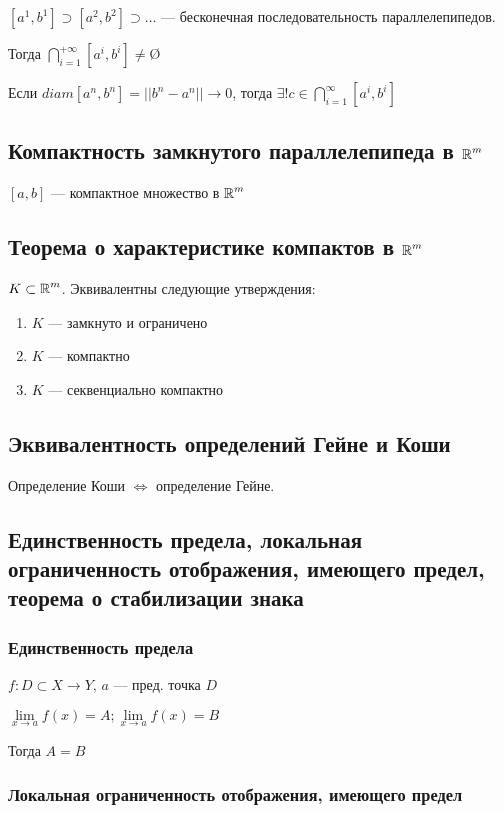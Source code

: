 $[a^1, b^1]\supset[a^2, b^2]\supset\ldots$ --- бесконечная последовательность параллелепипедов.

Тогда $\bigcap\limits_{i=1}^{+\infty}[a^i, b^i]\not=$\O

Если $diam[a^n, b^n]=||b^n-a^n||\to 0$, тогда $\exists! c\in\bigcap\limits_{i=1}^\infty[a^i, b^i]$

\subsection{Компактность замкнутого параллелепипеда в $\operatorname*{\mathbb{R}}^m$}

$[a,b]$ --- компактное множество в $\operatorname*{\mathbb{R}}^m$

\subsection{Теорема о характеристике компактов в $\operatorname*{\mathbb{R}}^m$}

$K\subset \operatorname*{\mathbb{R}}^m$. Эквивалентны следующие утверждения:\begin{enumerate}
    \itemsep-0.5em
    \item $K$ --- замкнуто и ограничено
    \item $K$ --- компактно
    \item $K$ --- секвенциально компактно
\end{enumerate}

\subsection{Эквивалентность определений Гейне и Коши}

Определение Коши $\Leftrightarrow$ определение Гейне.

\subsection{Единственность предела, локальная ограниченность отображения, имеющего предел, теорема о стабилизации знака}

\subsubsection{Единственность предела}

$f: D\subset X\to Y$, $a$ --- пред. точка $D$

$\lim\limits_{x\to a} f(x)=A; \lim\limits_{x\to a} f(x)=B$

Тогда $A=B$

\subsubsection{Локальная ограниченность отображения, имеющего предел}

